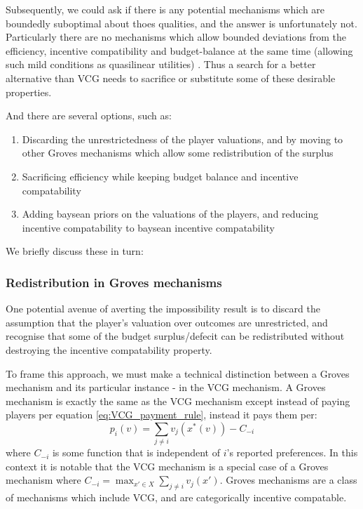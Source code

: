 Subsequently, we could ask if there is any potential mechanisms which are boundedly suboptimal about thoes qualities, and the answer is unfortunately not.
Particularly there are no mechanisms which allow bounded deviations from the efficiency, incentive compatibility and budget-balance at the same time (allowing such mild conditions as quasilinear utilities) \cite{YI201679}.
Thus a search for a better alternative than VCG needs to sacrifice or substitute some of these desirable properties.

And there are several options, such as:
\begin{enumerate}
    \item Discarding the unrestrictedness of the player valuations, and by moving to other Groves mechanisms which allow some redistribution of the surplus
    \item Sacrificing efficiency while keeping budget balance and incentive compatability
    \item Adding baysean priors on the valuations of the players, and reducing incentive compatability to baysean incentive compatability
\end{enumerate}

We briefly discuss these in turn:

\subsubsection{Redistribution in Groves mechanisms}

One potential avenue of averting the impossibility result is to discard the assumption that the player's valuation over outcomes are unrestricted, and recognise that some of the budget surplus/defecit can be redistributed without destroying the incentive compatability property.

To frame this approach, we must make a technical distinction between a Groves mechanism and its particular instance - in the VCG mechanism.
A Groves mechanism is exactly the same as the VCG mechanism except instead of paying players per equation \ref{eq:VCG_payment_rule}, instead it pays them per:
\begin{equation}\label{eq:Groves_payment_equation} p_i(v)=\sum_{j\ne i}v_j(x^*(v)) - C_{-i} \end{equation}
where $C_{-i}$ is some function that is independent of $i$'s reported preferences.
In this context it is notable that the VCG mechanism is a special case of a Groves mechanism where $C_{-i}= \max_{x'\in X}\sum_{j\ne i}v_j(x')$. \cite{10.2307/1914085}
Groves mechanisms are a class of mechanisms which include VCG, and are categorically incentive compatable. 

